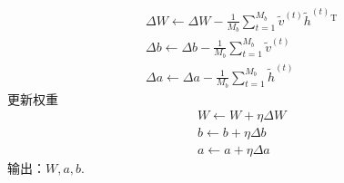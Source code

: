 \begin{algorithm}[htbp]
\begin{algorithmic}[1]
\begin{align*}
                        & \Delta W \leftarrow \Delta W - \frac{1}{M_b}\sum_{t=1}^{M_b} \tilde{v}^{(t)}\tilde{h}^{(t)}{}^\mathrm{T}\\
                        & \Delta b \leftarrow \Delta b - \frac{1}{M_b}\sum_{t=1}^{M_b} \tilde{v}^{(t)}\\
                        & \Delta a \leftarrow \Delta a - \frac{1}{M_b}\sum_{t=1}^{M_b} \tilde{h}^{(t)}
                        \end{align*}
                        \State 更新权重
                        \begin{align*}
                        & W \leftarrow W + \eta \Delta W\\
                        & b \leftarrow b+ \eta \Delta b\\
                        & a \leftarrow a+ \eta \Delta a
                        \end{align*}
                    \EndWhile
                    \State 输出：$W,a,b$.
                \end{algorithmic}
            \end{algorithm}


